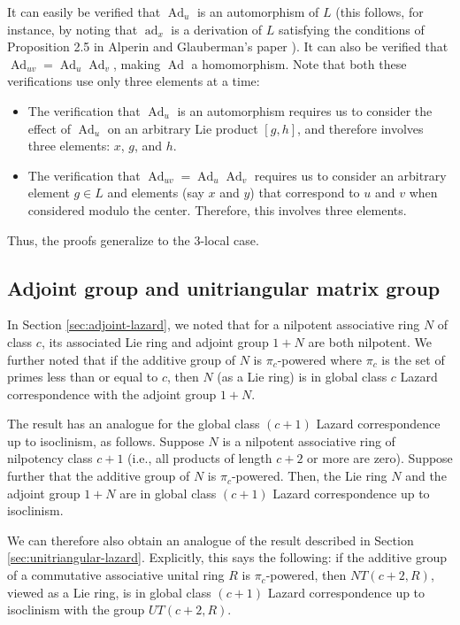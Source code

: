 It can easily be verified that $\operatorname{Ad}_u$ is an
automorphism of $L$ (this follows, for instance, by noting that
$\operatorname{ad}_x$ is a derivation of $L$ satisfying the conditions
of Proposition 2.5 in Alperin and Glauberman's paper \cite{AG98}). It
can also be verified that $\operatorname{Ad}_{uv} =
\operatorname{Ad}_u\operatorname{Ad}_v$, making $\operatorname{Ad}$ a
homomorphism. Note that both these verifications use only three
elements at a time:

\begin{itemize}
\item The verification that $\operatorname{Ad}_u$ is an automorphism
  requires us to consider the effect of $\operatorname{Ad}_u$ on an
  arbitrary Lie product $[g,h]$, and therefore involves three
  elements: $x$, $g$, and $h$.
\item The verification that $\operatorname{Ad}_{uv} =
  \operatorname{Ad}_u\operatorname{Ad}_v$ requires us to consider an
  arbitrary element $g \in L$ and elements (say $x$ and $y$) that
  correspond to $u$ and $v$ when considered modulo the
  center. Therefore, this involves three elements.
\end{itemize}

Thus, the proofs generalize to the $3$-local case.

\subsection{Adjoint group and unitriangular matrix group}

In Section \ref{sec:adjoint-lazard}, we noted that for a nilpotent
associative ring $N$ of class $c$, its associated Lie ring and adjoint
group $1 + N$ are both nilpotent. We further noted that if the
additive group of $N$ is $\pi_c$-powered where $\pi_c$ is the set of
primes less than or equal to $c$, then $N$ (as a Lie ring) is in
global class $c$ Lazard correspondence with the adjoint group $1 + N$.

The result has an analogue for the global class $(c + 1)$ Lazard
correspondence up to isoclinism, as follows. Suppose $N$ is a
nilpotent associative ring of nilpotency class $c + 1$ (i.e., all
products of length $c + 2$ or more are zero). Suppose further that the
additive group of $N$ is $\pi_c$-powered. Then, the Lie ring $N$ and
the adjoint group $1 + N$ are in global class $(c + 1)$ Lazard
correspondence up to isoclinism.

We can therefore also obtain an analogue of the result described in
Section \ref{sec:unitriangular-lazard}. Explicitly, this says the
following: if the additive group of a commutative associative unital
ring $R$ is $\pi_c$-powered, then $NT(c + 2,R)$, viewed as a Lie ring,
is in global class $(c + 1)$ Lazard correspondence up to isoclinism
with the group $UT(c + 2,R)$.

